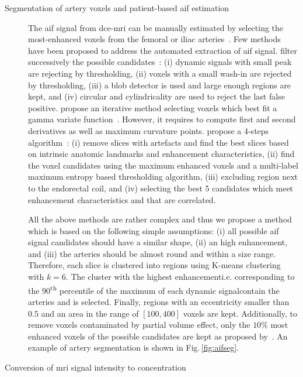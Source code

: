 \begin{description}
  \item[Segmentation of artery voxels and patient-based \ac{aif} estimation] The \ac{aif} signal from \ac{dce}-\ac{mri} can be manually estimated by selecting the most-enhanced voxels from the femoral or iliac arteries~\citep{meng2010comparison}.
    Few methods have been proposed to address the automated extraction of \ac{aif} signal.
    \citeauthor{chen2008automatic} filter successively the possible candidates~\citep{chen2008automatic}:
    (i) dynamic signals with small peak are rejecting by thresholding,
    (ii) voxels with a small wash-in are rejected by thresholding,
    (iii) a blob detector is used and large enough regions are kept, and
    (iv) circular and cylindricality are used to reject the last false positive.
    \citeauthor{zhu2011automated} propose an iterative method selecting voxels which best fit a gamma variate function~\citep{zhu2011automated}.
    However, it requires to compute first and second derivatives as well as maximum curvature points.
    \citeauthor{shanbhag2012generalized} propose a 4-steps algorithm~\citep{shanbhag2012generalized,fennessy2015quantitative}:
    (i) remove slices with artefacts and find the best slices based on intrinsic anatomic landmarks and enhancement characteristics,
    (ii) find the voxel candidates using the maximum enhanced voxels and a multi-label maximum entropy based thresholding algorithm,
    (iii) excluding region next to the endorectal coil, and
    (iv) selecting the best 5 candidates which meet enhancement characteristics and that are correlated.

    All the above methods are rather complex and thus we propose a method which is based on the following simple assumptions:
    (i) all possible \ac{aif} signal candidates should have a similar shape,
    (ii) an high enhancement, and
    (iii) the arteries should be almost round and within a size range.
    Therefore, each slice is clustered into regions using K-means clustering with $k=6$.
    The cluster with the highest enhancement\textemdash i.e. corresponding to the 90\textsuperscript{th} percentile of the maximum of each dynamic signal\textemdash contain the arteries and is selected.
    Finally, regions with an eccentricity smaller than $0.5$ and an area in the range of $[100, 400]$ voxels are kept.
    Additionally, to remove voxels contaminated by partial volume effect, only the $10\%$ most enhanced voxels of the possible candidates are kept as proposed by~\citep{schabel2008uncertainty}.
    An example of artery segmentation is shown in Fig.\,\ref{fig:aifseg}.
    \item[Conversion of \ac{mri} signal intensity to concentration]    
\end{description}

